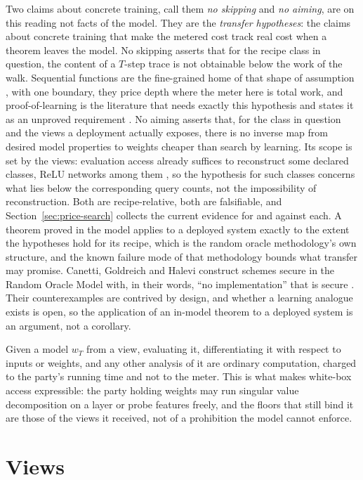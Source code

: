 \documentclass[11pt]{article}
\theoremstyle{definition}
\theoremstyle{plain}
\theoremstyle{remark}
\begin{document}
Two claims about concrete training, call them \emph{no skipping} and \emph{no
aiming}, are on this reading not facts of the model. They are the
\emph{transfer hypotheses}: the
claims about concrete training that make the metered cost track real cost when a
theorem leaves the model. No skipping asserts that for the recipe class in
question, the content of a $T$-step trace is not obtainable below the work of
the walk. Sequential functions are the fine-grained home of that shape of
assumption \cite{GM24}, with one boundary, they price depth where the meter here
is total work, and proof-of-learning is the literature that needs exactly this
hypothesis and states it as an unproved requirement \cite{JYCDTCP21}. No aiming
asserts that, for the class in question and the views a deployment actually
exposes, there is no inverse map from desired model properties to weights
cheaper than search by learning. Its scope is set by the views: evaluation
access already suffices to reconstruct some declared classes, ReLU networks
among them \cite{CJM20}, so the hypothesis for such classes concerns what lies
below the corresponding query counts, not the impossibility of reconstruction. Both are
recipe-relative, both are falsifiable, and Section~\ref{sec:price-search}
collects the current evidence for and against each. A theorem proved in the
model applies to a deployed system exactly to the extent the hypotheses hold for
its recipe, which is the random oracle methodology's own structure, and the
known failure mode of that methodology bounds what transfer may promise.
Canetti, Goldreich and Halevi construct schemes secure in the Random Oracle
Model with, in their words, ``no implementation'' that is secure \cite{CGH04}.
Their counterexamples are contrived by design, and whether a learning analogue
exists is open, so the application of an in-model theorem to a deployed system
is an argument, not a corollary.

Given a model $w_T$ from a view, evaluating it, differentiating it with respect
to inputs or weights, and any other analysis of it are ordinary computation,
charged to the party's running time and not to the meter. This is what makes
white-box access expressible: the party holding weights may run singular value
decomposition on a layer or probe features freely, and the floors that still
bind it are those of the views it received, not of a prohibition the model
cannot enforce.

\section{Views}
\label{sec:view}
\end{document}
